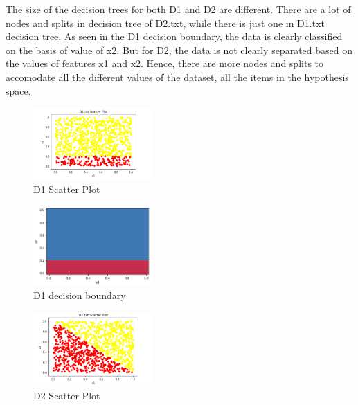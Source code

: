 \documentclass[a4paper]{article}
\theoremstyle{definition}
\newenvironment{soln}{
    \leavevmode\color{blue}\ignorespaces
}{}
\begin{document}
\begin{enumerate}
\begin{soln}

The size of the decision trees for both D1 and D2 are different. There are a lot of nodes and splits in decision tree of D2.txt, while there is just one in D1.txt decision tree. As seen in the D1 decision boundary, the data is clearly classified on the basis of value of x2. But for D2, the data is not clearly separated based on the values of features x1 and x2. Hence, there are more nodes and splits to accomodate all the different values of the dataset, all the items in the hypothesis space.  

	 \begin{figure}[h!]
	        \centering
	        \includegraphics[width=0.4\textwidth]{D1_Scatter.png} 
	        \captionsetup{labelformat=empty}
	        \caption{D1 Scatter Plot}
	        \label{fig:D1 Scatter Plot}
	   \end{figure}
	
	  \begin{figure}[h!]
	        \centering
	        \includegraphics[width=0.4\textwidth]{D1_boundary.png} 
	        \captionsetup{labelformat=empty}
	        \caption{D1 decision boundary}
	        \label{fig:D1 boundary}
	   \end{figure}

	 \begin{figure}[h!]
	        \centering
	        \includegraphics[width=0.4\textwidth]{D2_Scatter.png} 
	        \captionsetup{labelformat=empty}
	        \caption{D2 Scatter Plot}
	        \label{fig:D2 Scatter Plot}
	   \end{figure}	


\end{soln}
\end{enumerate}
\end{document}
